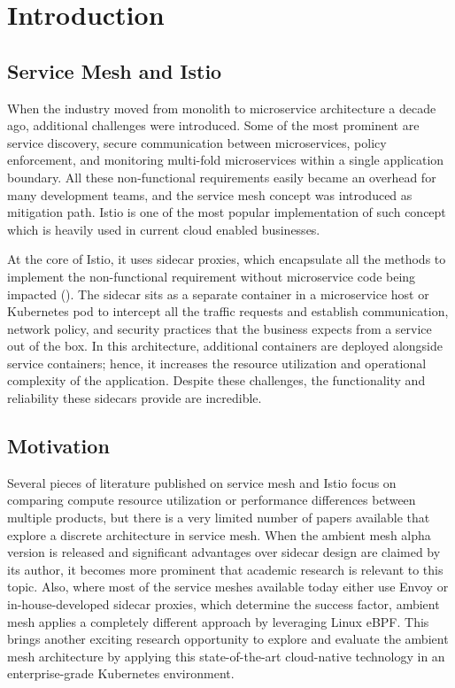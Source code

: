 \section{Introduction}
\subsection{Service Mesh and Istio}
When the industry moved from monolith to microservice architecture a decade ago, additional challenges were introduced. Some of the most prominent are service discovery, secure communication between microservices, policy enforcement, and monitoring multi-fold microservices within a single application boundary. All these non-functional requirements easily became an overhead for many development teams, and the service mesh concept was introduced as mitigation path. Istio is one of the most popular implementation of such concept which is heavily used in current cloud enabled businesses.

At the core of Istio, it uses sidecar proxies, which encapsulate all the methods to implement the non-functional requirement without microservice code being impacted (\cite{techcrunch2022}). The sidecar sits as a separate container in a microservice host or Kubernetes pod to intercept all the traffic requests and establish communication, network policy, and security practices that the business expects from a service out of the box. In this architecture, additional containers are deployed alongside service containers; hence, it increases the resource utilization and operational complexity of the application. Despite these challenges, the functionality and reliability these sidecars provide are incredible.

\subsection{Motivation}
Several pieces of literature published on service mesh and Istio focus on comparing compute resource utilization or performance differences between multiple products, but there is a very limited number of papers available that explore a discrete architecture in service mesh. When the ambient mesh alpha version is released and significant advantages over sidecar design are claimed by its author, it becomes more prominent that academic research is relevant to this topic. Also, where most of the service meshes available today either use Envoy or in-house-developed sidecar proxies, which determine the success factor, ambient mesh applies a completely different approach by leveraging Linux eBPF. This brings another exciting research opportunity to explore and evaluate the ambient mesh architecture by applying this state-of-the-art cloud-native technology in an enterprise-grade Kubernetes environment.

